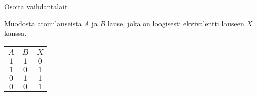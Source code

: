 \begin{tehtavasivu}
\begin{tehtava}
\end{tehtava}

\begin{tehtava}
     Osoita vaihdantalait

    \begin{vastaus}
    
    \end{vastaus}
    
\end{tehtava}

\begin{tehtava}
     Muodosta atomilauseista $A$ ja $B$ lause, joka on
loogisesti ekvivalentti lauseen $X$ kanssa.

\begin{center}
\begin{tabular}{|c|c|c|}\hline
$A$ & $B$ & $X$\\ \hline
$1$ & $1$ & $0$\\
$1$ & $0$ & $1$\\
$0$ & $1$ & $1$\\
$0$ & $0$ & $1$\\ \hline
\end{tabular}
\end{center}


\end{tehtava}
\end{tehtavasivu}
